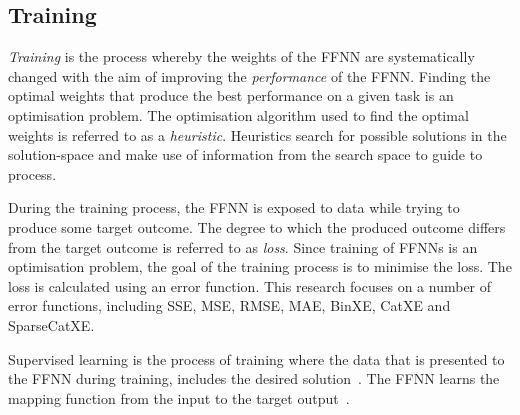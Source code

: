 \subsection{Training}
\label{sec:anns:training}

\textit{Training} is the process whereby the weights of the \acs{FFNN} are systematically changed with the aim of improving the \textit{performance} of the \acs{FFNN}. Finding the optimal weights that produce the best performance on a given task is an optimisation problem. The optimisation algorithm used to find the optimal weights is referred to as a \textit{heuristic}. Heuristics search for possible solutions in the solution-space and make use of information from the search space to guide to process.

During the training process, the \acs{FFNN} is exposed to data while trying to produce some target outcome. The degree to which the produced outcome differs from the target outcome is referred to as \textit{loss}. Since training of \acp{FFNN} is an optimisation problem, the goal of the training process is to minimise the loss. The loss is calculated using an error function. This research focuses on a number of error functions, including \acf{SSE}, \acf{MSE}, \acf{RMSE}, \acf{MAE}, \acf{BinXE}, \acf{CatXE} and \acf{SparseCatXE}.

Supervised learning is the process of training where the data that is presented to the \acs{FFNN} during training, includes the desired solution~\cite{ref:geron:2017}. The \acs{FFNN} learns the mapping function from the input to the target output~\cite{ref:brownlee:2016}.
